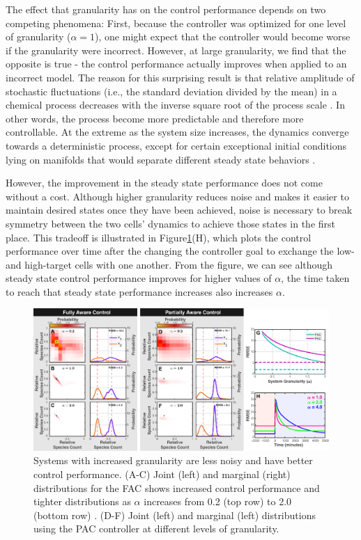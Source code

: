 \documentclass[12pt]{iopart}
\begin{document}
The effect that granularity has on the control performance depends on two competing phenomena: First, because the controller was optimized for one level of granularity ($\alpha = 1$), one might expect that the controller would become worse if the granularity were incorrect. However, at large granularity, we find that the opposite is true - the control performance actually improves when applied to an incorrect model. The reason for this surprising result is that relative amplitude of stochastic fluctuations (i.e., the standard deviation divided by the mean) in a chemical process decreases with the inverse square root of the process scale \cite{Kampen1961}. In other words, the process become more predictable and therefore more controllable. At the extreme as the system size increases, the dynamics converge towards a deterministic process, except for certain exceptional initial conditions lying on manifolds that would separate different steady state behaviors \cite{XXX}. 

However, the improvement in the steady state performance does not come without a cost. Although higher granularity reduces noise and makes it easier to maintain desired states once they have been achieved, noise is necessary to break symmetry between the two cells' dynamics to achieve those states in the first place. This tradeoff is illustrated in Figure\ref{Volume}(H), which plots the control performance over time after the changing the controller goal to exchange the low- and high-target cells with one another.  From the figure, we can see although steady state control performance improves for higher values of $\alpha$, the time taken to reach that steady state performance increases also increases $\alpha$. 


\begin{figure}[t!]
\begin{center}
\includegraphics[width=1\textwidth]{Granularity.pdf}
\vspace{-0.1in}
\caption{Systems with increased granularity are less noisy and have better control performance. (A-C) Joint (left) and marginal (right) distributions for the FAC shows increased control performance and tighter distributions as $\alpha$ increases from 0.2 (top row) to 2.0 (bottom row) . (D-F) Joint (left) and marginal (left) distributions using the PAC controller at different levels of granularity.}
\label{Volume}
\end{center}
\vspace{-0.2in}
\end{figure}
\end{document}
